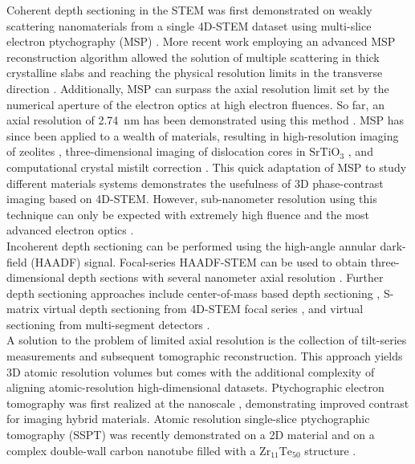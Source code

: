 \documentclass[12pt]{iopart}
\begin{document}
Coherent depth sectioning in the STEM was first demonstrated on weakly scattering nanomaterials from a single 4D-STEM dataset using multi-slice electron ptychography (MSP) \cite{Gao_2017_3dptycho}. More recent work employing an advanced MSP reconstruction algorithm allowed the solution of multiple scattering in thick crystalline slabs and reaching the physical resolution limits in the transverse direction \cite{chen2021electron}. Additionally, MSP can surpass the axial resolution limit set by the numerical aperture of the electron optics at high electron fluences. So far, an axial resolution of \SI{2.74}{\nano\meter} has been demonstrated using this method \cite{Leary_2023}. MSP has since been applied to a wealth of materials, resulting in high-resolution imaging of zeolites \cite{zhang2023three}, three-dimensional imaging of dislocation cores in $\mathrm{SrTiO_3}$ \cite{sha2023sub}, and computational crystal mistilt correction \cite{sha2022deep}. This quick adaptation of MSP to study different materials systems demonstrates the usefulness of 3D phase-contrast imaging based on 4D-STEM. However, sub-nanometer resolution using this technique can only be expected with extremely high fluence and the most advanced electron optics \cite{Chen_Shao_Jiang_Muller_2021}.\\
Incoherent depth sectioning can be performed using the high-angle annular dark-field (HAADF) signal. Focal-series HAADF-STEM can be used to obtain three-dimensional depth sections with several nanometer axial resolution \cite{Xin_Muller_2009,Behan_2009,VanDyck_2010,Ishikawa_2014,Ishikawa_2015,Ishikawa_2020,Yang_2015,Hovden_Xin_Muller_2011}. Further depth sectioning approaches include center-of-mass based depth sectioning \cite{Robert_2022}, S-matrix virtual depth sectioning from 4D-STEM focal series \cite{Brown_2022,Terzoudis_Findlay_2023}, and virtual sectioning from multi-segment detectors \cite{Rose_2022,Lee_Kaiser_Rose_2019}
\cite{Bosch_Lazic_2019}.\\
A solution to the problem of limited axial resolution is the collection of tilt-series measurements and subsequent tomographic reconstruction. 
This approach yields 3D atomic resolution volumes but comes with the additional complexity of aligning atomic-resolution high-dimensional datasets. 
Ptychographic electron tomography was first realized at the nanoscale \cite{Ding_2022}, demonstrating improved contrast for imaging hybrid materials.
Atomic resolution single-slice ptychographic tomography (SSPT) was recently demonstrated on a 2D material \cite{Hofer_Mustonen_Skakalova_Pennycook_2023} and on a complex double-wall carbon nanotube filled with a $\mathrm{Zr_{11}Te_{50}}$ structure \cite{Pelz_2023}.\\
\end{document}
